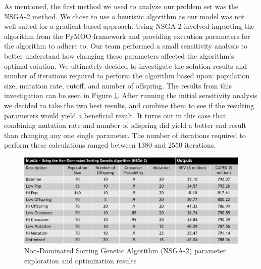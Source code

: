\documentclass[balance,upint,subscriptcorrection,varvw,mathalfa=cal=boondoxo,spanish,french,vietnamese,russian,greek,pdf-a,colorlinks]{asmeconf}
\begin{document}
As mentioned, the first method we used to analyze our problem set was the NSGA-2 method. We chose to use a heuristic algorithm as our model was not well suited for a gradient-based approach.  Using NSGA-2 involved importing the algorithm from the PyMOO framework and providing execution parameters for the algorithm to adhere to. Our team performed a small sensitivity analysis to better understand how changing these parameters affected the algorithm's optimal solution. We ultimately decided to investigate the solution results and number of iterations required to perform the algorithm based upon: population size, mutation rate, cutoff, and number of offspring. The results from this investigation can be seen in Figure \ref{NSGA:1}. After running the initial sensitivity analysis we decided to take the two best results, and combine them to see if the resulting parameters would yield a beneficial result. It turns out in this case that combining mutation rate and number of offspring did yield a better end result than changing any one single parameter. The number of iterations required to perform these calculations ranged between 1380 and 2550 iterations.



\begin{figure}[btp]
\centering\includegraphics[width=0.7\linewidth]{images/NSGA.jpg}
\caption{Non-Dominated Sorting Genetic Algorithm (NSGA-2) parameter exploration and optimization results}\label{NSGA:1}
\end{figure}

\end{document}
